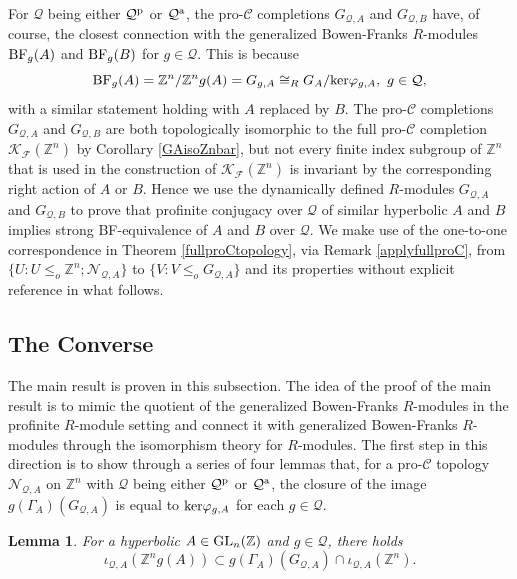 \documentclass{amsart}
\theoremstyle{plain}
\newtheorem{lemma}[theorem]{Lemma}
\theoremstyle{definition}
\theoremstyle{remark}
\begin{document}
For ${\mathcal Q}$ being either ${\mathcal Q}^{\rm p}$ or ${\mathcal Q}^{\rm a}$, the pro-${\mathcal C}$ completions $G_{{\mathcal Q},A}$ and $G_{ {\mathcal Q},B}$ have, of course, the closest connection with the generalized Bowen-Franks $R$-modules ${\rm BF}_g(A)$ and ${\rm BF}_g(B)$ for $g\in {\mathcal Q}$. This is because
\[ {\rm BF}_g(A) = {\mathbb Z}^n/{\mathbb Z}^n g(A) = G_{g,A} \cong_R G_A/{\rm ker}\varphi_{g,A},\ g\in {\mathcal Q},\]
with a similar statement holding with $A$ replaced by $B$. The pro-${\mathcal C}$ completions $G_{{\mathcal Q},A}$ and $G_{ {\mathcal Q},B}$ are both topologically isomorphic to the full pro-${\mathcal C}$ completion ${\mathcal K}_{\mathcal F}({\mathbb Z}^n)$ by Corollary \ref{GAisoZnbar}, but not every finite index subgroup of ${\mathbb Z}^n$ that is used in the construction of ${\mathcal K}_{\mathcal F}({\mathbb Z}^n)$ is invariant by the corresponding right action of $A$ or $B$. Hence we use the dynamically defined $R$-modules $G_{{\mathcal Q},A}$ and $G_{ {\mathcal Q},B}$ to prove that profinite conjugacy over ${\mathcal Q}$ of similar hyperbolic $A$ and $B$ implies strong {\rm BF}-equivalence of $A$ and $B$ over ${\mathcal Q}$. We make use of the one-to-one correspondence in Theorem \ref{fullproCtopology}, via Remark \ref{applyfullproC}, from $\{ U: U\leq_o {\mathbb Z}^n; {\mathcal N}_{ {\mathcal Q},A}\}$ to $\{ V: V\leq_o G_{ {\mathcal Q},A}\}$ and its properties without explicit reference in what follows. 



\subsection{The Converse} The main result is proven in this subsection. The idea of the proof of the main result is to mimic the quotient of the generalized Bowen-Franks $R$-modules in the profinite $R$-module setting and connect it with generalized Bowen-Franks $R$-modules through the isomorphism theory for $R$-modules. The first step in this direction is to show through a series of four lemmas that, for a pro-${\mathcal C}$ topology ${\mathcal N}_{ {\mathcal Q},A}$ on ${\mathbb Z}^n$ with ${\mathcal Q}$ being either ${\mathcal Q}^{\rm p}$ or ${\mathcal Q}^{\rm a}$, the closure of the image $g(\Gamma_A)(G_{ {\mathcal Q},A})$ is equal to ${\rm ker}\varphi_{g,A}$ for each $g\in {\mathcal Q}$.

\begin{lemma}\label{intersection} For a hyperbolic $A\in {\rm GL}_n({\mathbb Z})$ and $g\in{\mathcal Q}$, there holds
\[\iota_{ {\mathcal Q},A}({\mathbb Z}^n g(A))\subset g(\Gamma_A) (G_{ {\mathcal Q},A})\cap \iota_{ {\mathcal Q},A}({\mathbb Z}^n).\]
\end{lemma}
\end{document}
